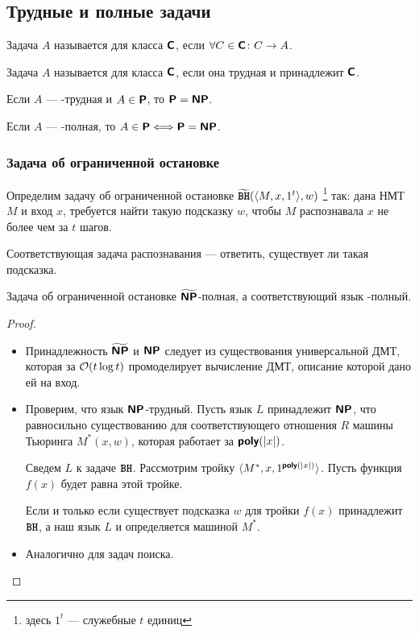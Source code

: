\subsection{Трудные и полные задачи}
\begin{defn}
	Задача $ A$ называется  для класса $\Class$, если  $ \forall C \in \Class \colon C \to A$.

	\noindent
	Задача $ A$ называется  для класса $ \Class$, если она трудная и принадлежит $ \Class$.
\end{defn}

\begin{thm}
    Если $ A$ --- \NP-трудная и $ A \in \P$, то $ \P = \NP$.
\end{thm}
\begin{cor}
    Если $ A$ --- \NP-полная, то $
    A \in \P \Longleftrightarrow \P = \NP
    $. 
\end{cor}

\subsubsection{Задача об ограниченной остановке}
\begin{defn}[\BH]
	Определим задачу об ограниченной остановке $ \tBH(\langle M, x, 1^{t} \rangle, w)$ \footnote{здесь $ 1^{t}$ --- служебные $ t$ единиц} так:
	дана НМТ $ M$ и вход $ x$, требуется найти такую подсказку $ w$, чтобы $ M$ распознавала $ x$ не более чем за $ t$ шагов.

	\noindent
	Соответствующая задача распознавания --- ответить, существует ли такая подсказка.
\end{defn}
\begin{thm}
    Задача об ограниченной остановке $ \tNP$-полная, а соответствующий язык \NP-полный.
\end{thm}
\begin{proof}
	\begin{itemize}
		\item Принадлежность $ \tNP$ и $ \NP$ следует из существования универсальной ДМТ, которая за $ \O(t \log t)$ промоделирует вычисление ДМТ, описание которой дано ей на вход.
		\item Проверим, что язык  $ \NP$-трудный.
			Пусть  язык $ L$ принадлежит $ \NP$, что равносильно существованию для соответствующего отношения $ R$ машины Тьюринга $ M^{*}(x, w)$, которая работает за $ \poly(\lvert x \rvert )$.

			Сведем $ L$ к задаче $ \BH$. Рассмотрим тройку $ \langle M^{*}, x, 1^{\poly(\lvert x \rvert )} \rangle$. 
			Пусть функция $ f(x)$ будет равна этой тройке.

			Если и только если существует подсказка $ w$ для тройки $ f(x) $ принадлежит $ \BH$, а наш язык $ L$ и определяется машиной $ M^{*}$. 
		\item Аналогично для задач поиска.
    \end{itemize}
\end{proof}

